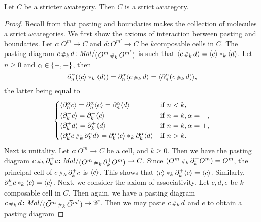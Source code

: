 \begin{prop} \label{prop:stricter_are_strict}
    Let \( C \) be a stricter \( \omega \)\nbd category.
    Then \( C \) is a strict \( \omega \)\nbd category.
\end{prop}
\begin{proof}
    Recall from \cite[Theorem 5.2.5]{hadzihasanovic2024combinatorics} that pasting and boundaries makes the collection of molecules a strict \( \omega \)\nbd categories. 
    We first show the axioms of interaction between pasting and boundaries. 
    Let \( c \colon O^{m} \to C \) and \( d \colon O^{m'} \to C \) be \( k \)\nbd composable cells in \( C \).
    The pasting diagram \( c \cp{k} d \colon \molecin{(O^m \cp{k} O^{m'})} \) is such that \( \langle c \,{\scriptstyle\#}_{k}\, d\rangle = \langle c\rangle *_{k} \langle d\rangle \).
    Let \( n \geq 0 \) and \( \alpha \in \left\{ {-, +} \right\} \), then
    \begin{equation*}
         \partial_{n}^{\alpha} (\langle c\rangle *_{k} \langle d\rangle) = \partial_{n}^{\alpha} \langle c \,{\scriptstyle\#}_{k}\, d\rangle = \langle\partial_{n}^{\alpha} (c \,{\scriptstyle\#}_{k}\, d)\rangle,
    \end{equation*}
    the latter being equal to
    \begin{equation*}
        \begin{cases}
            \langle\partial_{n}^{\alpha} c\rangle = \partial_{n}^{\alpha} \langle c\rangle = \partial_{n}^{\alpha} \langle d\rangle & \text{if } n < k,\\
            \langle\partial_{k}^{-}c\rangle = \partial_{k}^{-}\langle c\rangle & \text{if } n = k, \alpha = -,\\
            \langle\partial_{k}^{+}d\rangle = \partial_{k}^{+}\langle d\rangle & \text{if } n = k, \alpha = +,\\
            \langle\partial_{k}^{\alpha}c \,{\scriptstyle\#}_{k}\, \partial_{k}^{\alpha} d\rangle = \partial_{k}^{\alpha}\langle c\rangle *_{k} \partial_{k}^{\alpha} \langle d\rangle & \text{if } n > k.
        \end{cases}
    \end{equation*}
    Next is unitality.
    Let \( c \colon O^m \to C \) be a cell, and \( k \geq 0 \).
    Then we have the pasting diagram \( c \cp{k} \bd{k}{+} c \colon \molecin{(O^m \cp{k} \bd{k}{+} O^m)} \to C \).
    Since \( (O^m \,{\scriptstyle\#}_{k}\, \partial_{k}^{+} O^m) = O^m \), the principal cell of \( c \,{\scriptstyle\#}_{k}\, \partial_{k}^{+} c \) is \( \langle c\rangle \).
    This shows that \( \langle c\rangle *_{k} \partial_{k}^{+} \langle c\rangle = \langle c\rangle \).
    Similarly, \(  \partial_{-}^{k} c *_{k} \langle c\rangle = \langle c\rangle \).
    Next, we consider the axiom of associativity. 
    Let \( c, d, e \) be \( k \)\nbd composable cell in \( C \).
    Then again, we have a pasting diagram \( c \cp{k} d \colon \molecin{(\dglobe{m} \cp{k} \dglobe{m'})} \to \C \).
    Then we may paste \( c \,{\scriptstyle\#}_{k}\, d \) and \( e \) to obtain a pasting diagram 

\end{proof}
